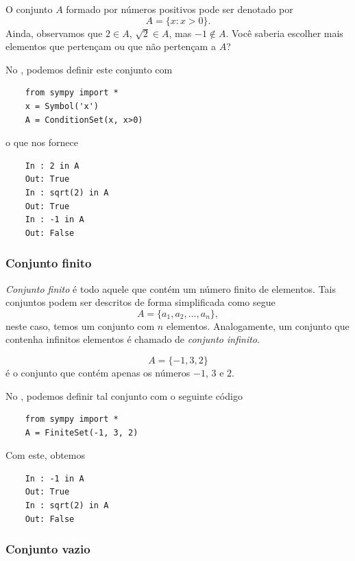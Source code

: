 \begin{ex}
  O conjunto $A$ formado por números positivos pode ser denotado por
  \begin{equation}
    A = \{x: x>0\}.
  \end{equation}
  Ainda, observamos que $2\in A$, $\sqrt{2}\in A$, mas $-1\not\in A$. Você saberia escolher mais elementos que pertençam ou que não pertençam a $A$?

  \ifispython
  No \python, podemos definir este conjunto com
  \begin{lstlisting}
    from sympy import *
    x = Symbol('x')
    A = ConditionSet(x, x>0)
  \end{lstlisting}
  o que nos fornece
  \begin{lstlisting}
    In : 2 in A
    Out: True
    In : sqrt(2) in A
    Out: True
    In : -1 in A
    Out: False
  \end{lstlisting}
  \fi
\end{ex}

\subsubsection{Conjunto finito}

\emph{Conjunto finito} é todo aquele que contém um número finito de elementos. Tais conjuntos podem ser descritos de forma simplificada como segue
\begin{equation}
  A = \{a_1, a_2, \ldots, a_n\},
\end{equation}
neste caso, temos um conjunto com $n$ elementos. Analogamente, um conjunto que contenha infinitos elementos é chamado de \emph{conjunto infinito}.

\begin{obs}
  \begin{equation}
    A = \{-1,3,2\}
  \end{equation}
  é o conjunto que contém apenas os números $-1$, $3$ e $2$.

  \ifispython
  No \python, podemos definir tal conjunto com o seguinte código
  \begin{lstlisting}
    from sympy import *
    A = FiniteSet(-1, 3, 2)
  \end{lstlisting}
  Com este, obtemos
  \begin{lstlisting}
    In : -1 in A
    Out: True
    In : sqrt(2) in A
    Out: False
  \end{lstlisting}
  \fi
\end{obs}

\subsubsection{Conjunto vazio}

